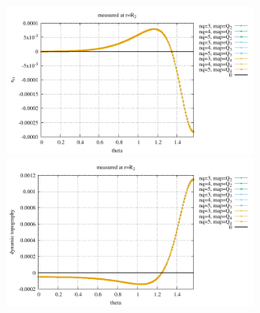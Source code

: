 \begin{center}
\includegraphics[width=8.3cm]{python_codes/fieldstone_152/results/exp2/err_R2}\\
\includegraphics[width=8.3cm]{python_codes/fieldstone_152/results/exp2/d_t_R2}
\end{center}

